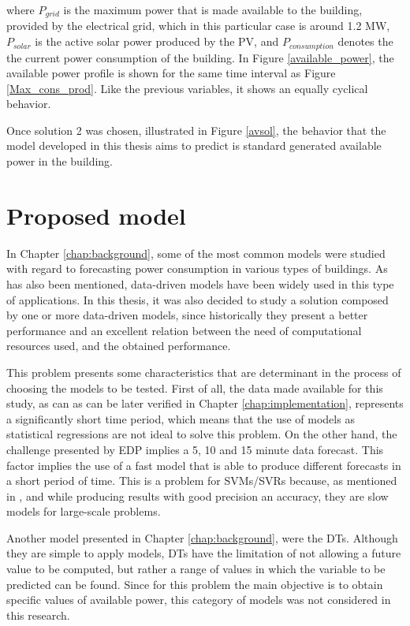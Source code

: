where $P_{grid}$ is the maximum power that is made available to the building, provided by the electrical grid, which in this particular case is around 1.2 MW, $P_{solar}$ is the active solar power produced by the \ac{PV}, and $P_{consumption}$ denotes the the current power consumption of the building. In Figure \ref{available_power}, the available power profile is shown for the same time interval as Figure \ref{Max_cons_prod}. Like the previous variables, it shows an equally cyclical behavior.

Once solution 2 was chosen, illustrated in Figure \ref{avsol}, the behavior that the model developed in this thesis aims to predict is standard generated available power in the building.

\section{Proposed model}\label{chap4:pm}

In Chapter \ref{chap:background}, some of the most common models were studied with regard to forecasting power consumption in various types of buildings. As has also been mentioned, data-driven models have been widely used in this type of applications. In this thesis, it was also decided to study a solution composed by one or more data-driven models, since historically they present a better performance and an excellent relation between the need of computational resources used, and the obtained performance.

This problem presents some characteristics that are determinant in the process of choosing the models to be tested. First of all, the data made available for this study, as can as can be later verified in Chapter \ref{chap:implementation}, represents a significantly short time period, which means that the use of models as statistical regressions are not ideal to solve this problem. On the other hand, the challenge presented by \ac{EDP} implies a 5, 10 and 15 minute data forecast. This factor implies the use of a fast model that is able to produce different forecasts in a short period of time. This is a problem for \ac{SVM}s/\ac{SVR}s because, as mentioned in \cite{svm3}, \cite{svm2} and \cite{svm5} while producing results with good precision an accuracy, they are slow models for large-scale problems. 

Another model presented in Chapter \ref{chap:background}, were the \ac{DT}s. Although they are simple to apply models, \ac{DT}s have the limitation of not allowing a future value to be computed, but rather a range of values in which the variable to be predicted can be found. Since for this problem the main objective is to obtain specific values of available power, this category of models was not considered in this research.

